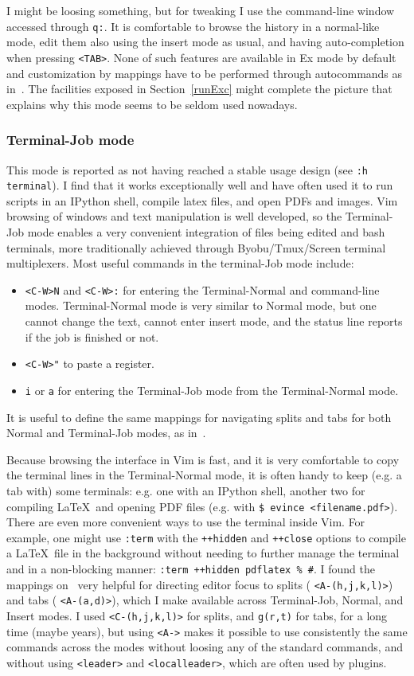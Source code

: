 \documentclass{article}
\newcommand{\ttt}[1] {
	\texttt{<#1>}}
\newcommand{\tttt}[1]{\texttt{#1}}
\begin{document}
I might be loosing something, but for
tweaking I use the command-line window accessed through \tttt{q:}.
It is comfortable to browse the history in a normal-like mode,
edit them also using the insert mode as usual,
and having auto-completion when pressing \ttt{TAB}.
None of such features are available in Ex mode by default
and
customization by mappings have to be performed through autocommands as in~\cite{vimrc}.
The facilities exposed in Section~\ref{runExc} might complete the picture
that explains why this mode seems to be seldom used nowadays.


\subsubsection{Terminal-Job mode}\label{terminal}
This mode is reported as not having reached a stable usage design
(see \tttt{:h terminal}).
I find that it works exceptionally well and have often used it to run
scripts in an IPython shell, compile latex files, and open PDFs and images.
Vim browsing of windows and text manipulation is well developed,
so the Terminal-Job mode enables a very convenient integration
of files being edited and bash terminals,
more traditionally achieved through Byobu/Tmux/Screen terminal
multiplexers.
Most useful commands in the terminal-Job mode include:
\begin{itemize}
  \item \tttt{<C-W>N} and \tttt{<C-W>:} for entering the Terminal-Normal
    and command-line modes. Terminal-Normal mode is very similar to
    Normal mode, but one cannot change the text, cannot enter insert
    mode, and the status line reports if the job is finished or not.
  \item \tttt{<C-W>"} to paste a register.
  \item \tttt{i} or \tttt{a} for entering the Terminal-Job mode from the Terminal-Normal mode.
\end{itemize}
\noindent It is useful to define the same mappings for navigating splits and tabs
for both Normal and Terminal-Job modes, as in~\cite{vimrc}.

Because browsing the interface in Vim is fast,
and it is very comfortable to copy the terminal lines
in the Terminal-Normal mode,
it is often handy to keep (e.g. a tab with) some terminals:
e.g. one with an IPython shell, another two for compiling \LaTeX\
and opening PDF files (e.g. with \tttt{\$ evince <filename.pdf>}).
There are even more convenient ways to use the terminal inside Vim.
For example, 
one might use \tttt{:term} with the \tttt{++hidden} and \tttt{++close}
options to compile a \LaTeX\ file in the background without needing to further manage the
terminal and in a non-blocking manner: \tttt{:term ++hidden pdflatex
\% \#}.
I found the mappings on~\cite{vimrc} very helpful for directing
editor focus to splits (\ttt{A-(h,j,k,l)}) and tabs (\ttt{A-(a,d)}),
which I make available across Terminal-Job, Normal, and Insert modes.
I used \ttt{C-(h,j,k,l)} for splits, and \tttt{g(r,t)} for tabs,
for a long time (maybe years), but using \ttt{A-} makes it possible
to use consistently the same commands across the modes without
loosing any of the standard commands, and without using \ttt{leader}
and \ttt{localleader}, which are often used by plugins.
\end{document}
